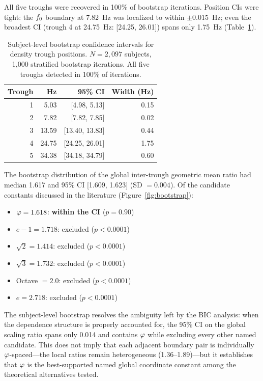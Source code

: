 All five troughs were recovered in 100\% of bootstrap iterations. Position CIs were tight: the $f_0$ boundary at 7.82~Hz was localized to within $\pm 0.015$~Hz; even the broadest CI (trough 4 at 24.75~Hz: [24.25, 26.01]) spans only 1.75~Hz (Table~\ref{tab:bootstrap_ci}).

\begin{table}[h]
\centering
\caption{Subject-level bootstrap confidence intervals for density trough positions. $N = 2{,}097$ subjects, 1,000 stratified bootstrap iterations. All five troughs detected in 100\% of iterations.}
\label{tab:bootstrap_ci}
\begin{tabular}{r r r r}
\toprule
Trough & Hz & 95\% CI & Width (Hz) \\
\midrule
1 & 5.03  & [4.98, 5.13]   & 0.15 \\
2 & 7.82  & [7.82, 7.85]   & 0.02 \\
3 & 13.59 & [13.40, 13.83] & 0.44 \\
4 & 24.75 & [24.25, 26.01] & 1.75 \\
5 & 34.38 & [34.18, 34.79] & 0.60 \\
\bottomrule
\end{tabular}
\end{table}

The bootstrap distribution of the global inter-trough geometric mean ratio had median 1.617 and 95\% CI [1.609, 1.623] (SD $= 0.004$). Of the candidate constants discussed in the literature (Figure~\ref{fig:bootstrap}):

\begin{itemize}
    \item $\varphi = 1.618$: \textbf{within the CI} ($p = 0.90$)
    \item $e - 1 = 1.718$: excluded ($p < 0.0001$)
    \item $\sqrt{2} = 1.414$: excluded ($p < 0.0001$)
    \item $\sqrt{3} = 1.732$: excluded ($p < 0.0001$)
    \item Octave $= 2.0$: excluded ($p < 0.0001$)
    \item $e = 2.718$: excluded ($p < 0.0001$)
\end{itemize}

The subject-level bootstrap resolves the ambiguity left by the BIC analysis: when the dependence structure is properly accounted for, the 95\% CI on the global scaling ratio spans only 0.014 and contains $\varphi$ while excluding every other named candidate. This does not imply that each adjacent boundary pair is individually $\varphi$-spaced---the local ratios remain heterogeneous (1.36--1.89)---but it establishes that $\varphi$ is the best-supported named global coordinate constant among the theoretical alternatives tested.

